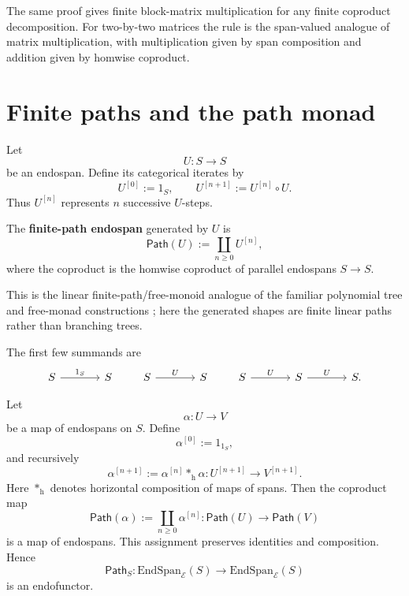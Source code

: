 The same proof gives finite block-matrix multiplication for any finite
coproduct decomposition. For two-by-two matrices the rule is the span-valued
analogue of matrix multiplication, with multiplication given by span
composition and addition given by homwise coproduct.

\section{Finite paths and the path monad}
\label{sec:finite-paths-and-path-monad}

Let
\[
  U:S\to S
\]
be an endospan. Define its categorical iterates by
\[
  U^{[0]}:=1_S,
  \qquad
  U^{[n+1]}:=U^{[n]}\circ U.
\]
Thus \(U^{[n]}\) represents \(n\) successive \(U\)-steps.

\begin{definition}
\label{def:finite-path-endospan}
The \textbf{finite-path endospan} generated by \(U\) is
\[
  \mathsf{Path}(U)
  :=
  \coprod_{n\geq 0}U^{[n]},
\]
where the coproduct is the homwise coproduct of parallel endospans
\(S\to S\).
\end{definition}

This is the linear finite-path/free-monoid analogue of the familiar
polynomial tree and free-monad constructions
\cite{Kock2011PolynomialTrees}; here the generated shapes are finite
linear paths rather than branching trees.

The first few summands are
\[
\begin{tikzcd}[column sep=large,row sep=large]
  S
    \ar[r,"1_S"]
  &
  S
\end{tikzcd}
\qquad
\begin{tikzcd}[column sep=large,row sep=large]
  S
    \ar[r,"U"]
  &
  S
\end{tikzcd}
\qquad
\begin{tikzcd}[column sep=large,row sep=large]
  S
    \ar[r,"U"]
  &
  S
    \ar[r,"U"]
  &
  S .
\end{tikzcd}
\]

\begin{lemma}
\label{lem:path-functoriality-endospans}
Let
\[
  \alpha:U\longrightarrow V
\]
be a map of endospans on \(S\). Define
\[
  \alpha^{[0]}:=1_{1_S},
\]
and recursively
\[
  \alpha^{[n+1]}
  :=
  \alpha^{[n]}\ast_{\mathrm h}\alpha:
  U^{[n+1]}\longrightarrow V^{[n+1]}.
\]
Here \(\ast_{\mathrm h}\) denotes horizontal composition of maps of spans.
Then the coproduct map
\[
  \mathsf{Path}(\alpha)
  :=
  \coprod_{n\geq 0}\alpha^{[n]}
  :
  \mathsf{Path}(U)\longrightarrow\mathsf{Path}(V)
\]
is a map of endospans. This assignment preserves identities and composition.
Hence
\[
  \mathsf{Path}_S:
  \mathrm{EndSpan}_{\mathcal E}(S)
  \longrightarrow
  \mathrm{EndSpan}_{\mathcal E}(S)
\]
is an endofunctor.
\end{lemma}

